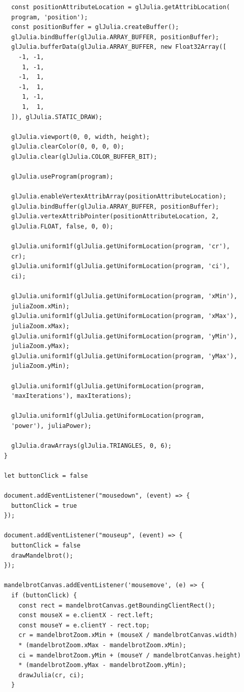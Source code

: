 \documentclass[12pt,a4paper]{report}
\begin{document}
\begin{verbatim}
      const positionAttributeLocation = glJulia.getAttribLocation(
      program, 'position');
      const positionBuffer = glJulia.createBuffer();
      glJulia.bindBuffer(glJulia.ARRAY_BUFFER, positionBuffer);
      glJulia.bufferData(glJulia.ARRAY_BUFFER, new Float32Array([
        -1, -1,
         1, -1,
        -1,  1,
        -1,  1,
         1, -1,
         1,  1,
      ]), glJulia.STATIC_DRAW);

      glJulia.viewport(0, 0, width, height);
      glJulia.clearColor(0, 0, 0, 0);
      glJulia.clear(glJulia.COLOR_BUFFER_BIT);

      glJulia.useProgram(program);

      glJulia.enableVertexAttribArray(positionAttributeLocation);
      glJulia.bindBuffer(glJulia.ARRAY_BUFFER, positionBuffer);
      glJulia.vertexAttribPointer(positionAttributeLocation, 2, 
      glJulia.FLOAT, false, 0, 0);

      glJulia.uniform1f(glJulia.getUniformLocation(program, 'cr'), 
      cr);
      glJulia.uniform1f(glJulia.getUniformLocation(program, 'ci'), 
      ci);

      glJulia.uniform1f(glJulia.getUniformLocation(program, 'xMin'), 
      juliaZoom.xMin);
      glJulia.uniform1f(glJulia.getUniformLocation(program, 'xMax'), 
      juliaZoom.xMax);
      glJulia.uniform1f(glJulia.getUniformLocation(program, 'yMin'), 
      juliaZoom.yMax);
      glJulia.uniform1f(glJulia.getUniformLocation(program, 'yMax'), 
      juliaZoom.yMin);

      glJulia.uniform1f(glJulia.getUniformLocation(program, 
      'maxIterations'), maxIterations);

      glJulia.uniform1f(glJulia.getUniformLocation(program, 
      'power'), juliaPower);

      glJulia.drawArrays(glJulia.TRIANGLES, 0, 6);
    }

    let buttonClick = false

    document.addEventListener("mousedown", (event) => {
      buttonClick = true
    });

    document.addEventListener("mouseup", (event) => {
      buttonClick = false
      drawMandelbrot();
    });

    mandelbrotCanvas.addEventListener('mousemove', (e) => {
      if (buttonClick) {
        const rect = mandelbrotCanvas.getBoundingClientRect();
        const mouseX = e.clientX - rect.left;
        const mouseY = e.clientY - rect.top;
        cr = mandelbrotZoom.xMin + (mouseX / mandelbrotCanvas.width) 
        * (mandelbrotZoom.xMax - mandelbrotZoom.xMin);
        ci = mandelbrotZoom.yMin + (mouseY / mandelbrotCanvas.height) 
        * (mandelbrotZoom.yMax - mandelbrotZoom.yMin);
        drawJulia(cr, ci);
      }


\end{verbatim}
\end{document}
